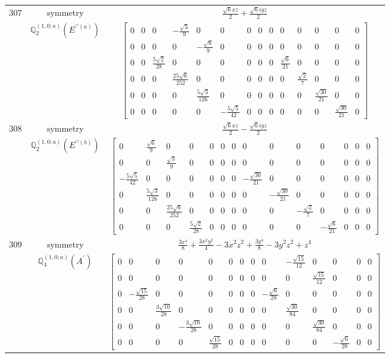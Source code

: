 \documentclass[fleqn,8pt,landscape]{jsarticle}
\begin{document}
\begin{longtable}{ccc}
$ 307 $ & $ \text{symmetry} $ & $ \frac{\sqrt{6} x z}{2} + \frac{\sqrt{6} i y z}{2} $ \\
$  $ & $ \mathbb{Q}_{2}^{(1,0;a)}(E^{\prime\prime(a)}) $ & $ \begin{bmatrix} 0 & 0 & 0 & - \frac{\sqrt{3}}{9} & 0 & 0 & 0 & 0 & 0 & 0 & 0 & 0 & 0 & 0 \\ 0 & 0 & 0 & 0 & - \frac{\sqrt{6}}{9} & 0 & 0 & 0 & 0 & 0 & 0 & 0 & 0 & 0 \\ 0 & 0 & \frac{5 \sqrt{2}}{28} & 0 & 0 & 0 & 0 & 0 & 0 & \frac{\sqrt{6}}{21} & 0 & 0 & 0 & 0 \\ 0 & 0 & 0 & \frac{25 \sqrt{6}}{252} & 0 & 0 & 0 & 0 & 0 & 0 & \frac{\sqrt{2}}{7} & 0 & 0 & 0 \\ 0 & 0 & 0 & 0 & \frac{5 \sqrt{3}}{126} & 0 & 0 & 0 & 0 & 0 & 0 & \frac{\sqrt{30}}{21} & 0 & 0 \\ 0 & 0 & 0 & 0 & 0 & - \frac{5 \sqrt{5}}{42} & 0 & 0 & 0 & 0 & 0 & 0 & \frac{\sqrt{30}}{21} & 0 \end{bmatrix} $ \\ \hline
$ 308 $ & $ \text{symmetry} $ & $ \frac{\sqrt{6} x z}{2} - \frac{\sqrt{6} i y z}{2} $ \\
$  $ & $ \mathbb{Q}_{2}^{(1,0;a)}(E^{\prime\prime(b)}) $ & $ \begin{bmatrix} 0 & \frac{\sqrt{6}}{9} & 0 & 0 & 0 & 0 & 0 & 0 & 0 & 0 & 0 & 0 & 0 & 0 \\ 0 & 0 & \frac{\sqrt{3}}{9} & 0 & 0 & 0 & 0 & 0 & 0 & 0 & 0 & 0 & 0 & 0 \\ - \frac{5 \sqrt{5}}{42} & 0 & 0 & 0 & 0 & 0 & 0 & - \frac{\sqrt{30}}{21} & 0 & 0 & 0 & 0 & 0 & 0 \\ 0 & \frac{5 \sqrt{3}}{126} & 0 & 0 & 0 & 0 & 0 & 0 & - \frac{\sqrt{30}}{21} & 0 & 0 & 0 & 0 & 0 \\ 0 & 0 & \frac{25 \sqrt{6}}{252} & 0 & 0 & 0 & 0 & 0 & 0 & - \frac{\sqrt{2}}{7} & 0 & 0 & 0 & 0 \\ 0 & 0 & 0 & \frac{5 \sqrt{2}}{28} & 0 & 0 & 0 & 0 & 0 & 0 & - \frac{\sqrt{6}}{21} & 0 & 0 & 0 \end{bmatrix} $ \\ \hline
$ 309 $ & $ \text{symmetry} $ & $ \frac{3 x^{4}}{8} + \frac{3 x^{2} y^{2}}{4} - 3 x^{2} z^{2} + \frac{3 y^{4}}{8} - 3 y^{2} z^{2} + z^{4} $ \\
$  $ & $ \mathbb{Q}_{4}^{(1,0;a)}(A^{\prime}) $ & $ \begin{bmatrix} 0 & 0 & 0 & 0 & 0 & 0 & 0 & 0 & 0 & - \frac{\sqrt{15}}{12} & 0 & 0 & 0 & 0 \\ 0 & 0 & 0 & 0 & 0 & 0 & 0 & 0 & 0 & 0 & \frac{\sqrt{15}}{12} & 0 & 0 & 0 \\ 0 & - \frac{\sqrt{15}}{28} & 0 & 0 & 0 & 0 & 0 & 0 & - \frac{\sqrt{6}}{28} & 0 & 0 & 0 & 0 & 0 \\ 0 & 0 & \frac{3 \sqrt{10}}{28} & 0 & 0 & 0 & 0 & 0 & 0 & \frac{\sqrt{30}}{84} & 0 & 0 & 0 & 0 \\ 0 & 0 & 0 & - \frac{3 \sqrt{10}}{28} & 0 & 0 & 0 & 0 & 0 & 0 & \frac{\sqrt{30}}{84} & 0 & 0 & 0 \\ 0 & 0 & 0 & 0 & \frac{\sqrt{15}}{28} & 0 & 0 & 0 & 0 & 0 & 0 & - \frac{\sqrt{6}}{28} & 0 & 0 \end{bmatrix} $ \\ \hline

\end{longtable}
\end{document}
